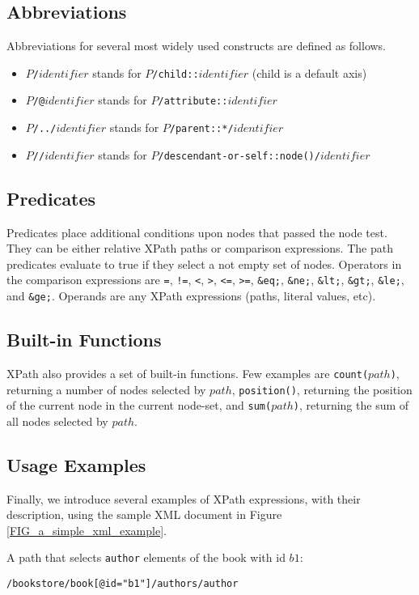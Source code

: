 \subsection{Abbreviations}
Abbreviations for several most widely used constructs are defined as follows.
\begin{itemize}
\item \texttt{$P$/$identifier$} stands for \texttt{$P$/child::$identifier$} (child is a default axis)
\item \texttt{$P$/@$identifier$} stands for \texttt{$P$/attribute::$identifier$}
\item \texttt{$P$/../$identifier$} stands for \texttt{$P$/parent::*/$identifier$}
\item \texttt{$P$//$identifier$} stands for \texttt{$P$/descendant-or-self::node()/$identifier$} 
\end{itemize}

\subsection{Predicates}
Predicates place additional conditions upon nodes that passed the node test. They can be either relative XPath paths or comparison expressions. The path predicates evaluate to true if they select a not empty set of nodes. Operators in the comparison expressions are \texttt{=}, \texttt{!=}, \texttt{<}, \texttt{>}, \texttt{<=}, \texttt{>=}, \texttt{\&eq;}, \texttt{\&ne;}, \texttt{\&lt;}, \texttt{\&gt;}, \texttt{\&le;}, and \texttt{\&ge;}. Operands are any XPath expressions (paths, literal values, etc).

\subsection{Built-in Functions}
XPath also provides a set of built-in functions. Few examples are \texttt{count($path$)}, returning a number of nodes selected by $path$, \texttt{position()}, returning the position of the current node in the current node-set, and \texttt{sum($path$)}, returning the sum of all nodes selected by $path$.

\subsection{Usage Examples}
Finally, we introduce several examples of XPath expressions, with their description, using the sample XML document in Figure \ref{FIG_a_simple_xml_example}.

A path that selects \texttt{author} elements of the book with id $b1$:
\begin{alltt}
/bookstore/book[@id = "b1"]/authors/author
\end{alltt}

